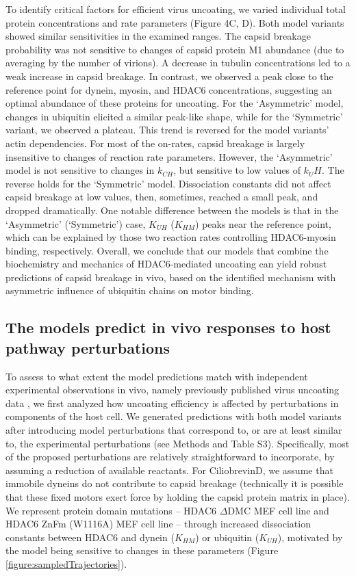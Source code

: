 To identify critical factors for efficient virus uncoating, we varied individual total protein concentrations and rate parameters (Figure 4C, D). Both model variants showed similar sensitivities in the examined ranges. The capsid breakage probability was not sensitive to changes of capsid protein M1 abundance (due to averaging by the number of virions). A decrease in tubulin concentrations led to a weak increase in capsid breakage. In contrast, we observed a peak close to the reference point for dynein, myosin, and HDAC6 concentrations, suggesting an optimal abundance of these proteins for uncoating. For the ‘Asymmetric’ model, changes in ubiquitin elicited a similar peak-like shape, while for the ‘Symmetric’ variant, we observed a plateau. This trend is reversed for the model variants’ actin dependencies. For most of the on-rates, capsid breakage is largely insensitive to changes of reaction rate parameters. However, the ‘Asymmetric’ model is not sensitive to changes in  $k_{CH}$, but sensitive to low values of $k_UH$. The reverse holds for the ‘Symmetric’ model. Dissociation constants did not affect capsid breakage at low values, then, sometimes, reached a small peak, and dropped dramatically. One notable difference between the models is that in the ‘Asymmetric’ (‘Symmetric’) case, $K_{UH}$ ($K_{HM}$) peaks near the reference point, which can be explained by those two reaction rates controlling HDAC6-myosin binding, respectively. Overall, we conclude that our models that combine the biochemistry and mechanics of HDAC6-mediated uncoating can yield robust predictions of capsid breakage in vivo, based on the identified mechanism with asymmetric influence of ubiquitin chains on motor binding.

\subsection{The models predict in vivo responses to host pathway perturbations}

To assess to what extent the model predictions match with independent experimental observations in vivo, namely previously published virus uncoating data \cite{banerjee2014influenza}, we first analyzed how uncoating efficiency is affected by perturbations in components of the host cell. We generated predictions with both model variants after introducing model perturbations that correspond to, or are at least similar to, the experimental perturbations (see Methods and Table S3). Specifically, most of the proposed perturbations are relatively straightforward to incorporate, by assuming a reduction of available reactants. For CiliobrevinD, we assume that immobile dyneins do not contribute to capsid breakage (technically it is possible that these fixed motors exert force by holding the capsid protein matrix in place). We represent protein domain mutations – HDAC6 $\Delta$DMC MEF cell line and HDAC6 ZnFm (W1116A) MEF cell line – through increased dissociation constants between HDAC6 and dynein ($K_{HM}$) or ubiquitin ($K_{UH}$), motivated by the model being sensitive to changes in these parameters (Figure \ref{figure:sampledTrajectories}).

